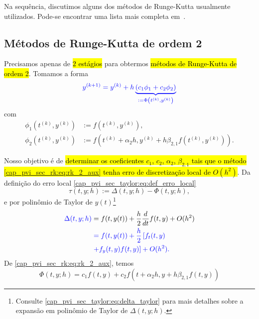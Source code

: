 Na sequência, discutimos alguns dos métodos de Runge-Kutta usualmente utilizados. Pode-se encontrar uma lista mais completa em~\cite[Cap. 8, Seção 3.2]{Isaacson1994a}.

\subsection{Métodos de Runge-Kutta de ordem 2}

Precisamos apenas de \hl{$2$ estágios} para obtermos \hl{métodos de Runge-Kutta de ordem 2}. Tomamos a forma
\begin{equation}\label{cap_pvi_sec_rk:eq:rk_2_aux}\color{blue}y^{(k+1)} = y^{(k)} + h\underbrace{\left(c_1\phi_1 + c_2\phi_2\right)}_{:= \Phi\left(t^{(k)}, y^{(k)}\right)}
\end{equation}
com
\begin{subequations}
  \begin{align}
    \phi_1\left(t^{(k)}, y^{(k)}\right) &:= f\left(t^{(k)}, y^{(k)}\right),\\
    \phi_2\left(t^{(k)}, y^{(k)}\right) &:= f\left(t^{(k)}+\alpha_2h, y^{(k)}+h\beta_{2,1}f(t^{(k)},y^{(k)})\right).
  \end{align}
\end{subequations}

Nosso objetivo é de \hl{determinar os coeficientes $c_1$, $c_2$, $\alpha_2$, $\beta_{2,1}$ tais que o método {\eqref{cap_pvi_sec_rk:eq:rk_2_aux}} tenha erro de discretização local de $O(h^2)$}. Da definição do erro local \eqref{cap_pvi_sec_taylor:eq:def_erro_local}
\begin{equation}
  \tau(t, y; h) := \Delta(t, y; h) - \Phi(t, y; h),
\end{equation}
e por polinômio de Taylor de $y(t)$\footnote{Consulte \eqref{cap_pvi_sec_taylor:eq:delta_taylor} para mais detalhes sobre a expansão em polinômio de Taylor de $\Delta(t, y; h)$.}
\begin{align}
  \color{blue}\Delta(t, y; h) &= f(t, y(t)) + \frac{h}{2}\frac{d}{dt}f(t, y) + O(h^2)\\
                  &\color{blue}= f(t, y(t)) + \frac{h}{2}\left[f_t(t, y)\right.\nonumber\\
                  &\color{blue}\left. + f_y(t, y)f(t, y)\right] + O(h^2)\label{cap_pvi_sec_rk:eq:pvi_delta_aux2}.
\end{align}
De \eqref{cap_pvi_sec_rk:eq:rk_2_aux}, temos
\begin{equation}
  \Phi(t, y; h) = c_1f(t, y) + c_2f\left(t+\alpha_2h, y+h\beta_{2,1}f(t,y)\right)
\end{equation}

